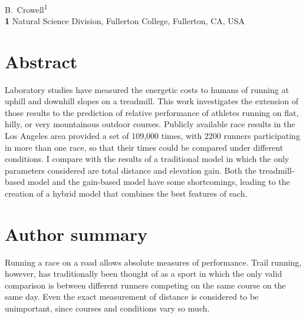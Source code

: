 \documentclass[10pt,letterpaper]{article}
\begin{document}
\vspace*{0.2in}

\begin{flushleft}
{\Large
\textbf{} 
}
\newline
\\
B.~Crowell\textsuperscript{1}
\\
\bigskip
\textbf{1} Natural Science Division, Fullerton College, Fullerton, CA, USA\\
\bigskip

\end{flushleft}

\linenumbers

\section*{Abstract}

Laboratory studies have measured the energetic costs to humans of running at
uphill and downhill slopes on a treadmill. This work investigates the extension
of those results to the prediction of relative performance of athletes running
on flat, hilly, or very mountainous outdoor courses.
Publicly available race results in the Los Angeles area provided a set of
109,000 times, with 2200 runners participating in more than one race, so that
their times could be compared under different conditions.
I compare with the results of
a traditional model in which the only parameters considered are total distance
and elevation gain. Both the treadmill-based model and the gain-based model
have some shortcomings, leading to the creation of a hybrid model that combines
the best features of each.


\section*{Author summary}
Running a race on a road allows absolute measures of performance. Trail running, however, has traditionally
been thought of as a sport in which the only valid comparison is between
different runners competing on the same course on the same day. Even the
exact measurement of distance is considered to be unimportant, since courses
and conditions vary so much. 
\end{document}

